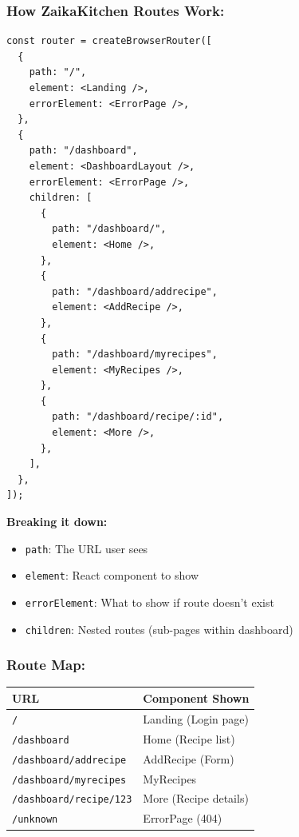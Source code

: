 \documentclass[12pt]{article}
\begin{document}
\subsubsection*{How ZaikaKitchen Routes Work:}

\begin{lstlisting}
const router = createBrowserRouter([
  {
    path: "/",
    element: <Landing />,
    errorElement: <ErrorPage />,
  },
  {
    path: "/dashboard",
    element: <DashboardLayout />,
    errorElement: <ErrorPage />,
    children: [
      {
        path: "/dashboard/",
        element: <Home />,
      },
      {
        path: "/dashboard/addrecipe",
        element: <AddRecipe />,
      },
      {
        path: "/dashboard/myrecipes",
        element: <MyRecipes />,
      },
      {
        path: "/dashboard/recipe/:id",
        element: <More />,
      },
    ],
  },
]);
\end{lstlisting}

\textbf{Breaking it down:}

\begin{itemize}
    \item \texttt{path}: The URL user sees
    \item \texttt{element}: React component to show
    \item \texttt{errorElement}: What to show if route doesn't exist
    \item \texttt{children}: Nested routes (sub-pages within dashboard)
\end{itemize}

\subsubsection*{Route Map:}

\begin{center}
\begin{tabular}{|l|l|}
\hline
\textbf{URL} & \textbf{Component Shown} \\
\hline
\texttt{/} & Landing (Login page) \\
\texttt{/dashboard} & Home (Recipe list) \\
\texttt{/dashboard/addrecipe} & AddRecipe (Form) \\
\texttt{/dashboard/myrecipes} & MyRecipes \\
\texttt{/dashboard/recipe/123} & More (Recipe details) \\
\texttt{/unknown} & ErrorPage (404) \\
\hline
\end{tabular}
\end{center}
\end{document}
